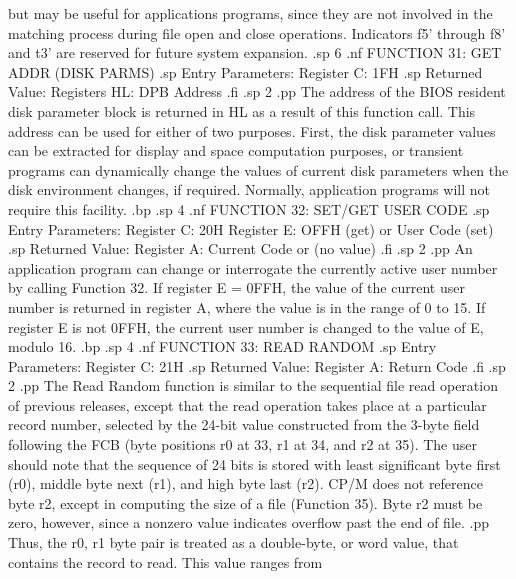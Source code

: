 but may be useful for applications programs, since they are not 
involved in the matching process during file open and close 
operations.  Indicators f5' through f8' and t3' are reserved for 
future system expansion.
.sp 6
.nf
               FUNCTION 31:  GET ADDR (DISK PARMS)
.sp
                Entry Parameters:
                      Register C:  1FH
.sp
                Returned Value:
                    Registers HL:  DPB Address
.fi
.sp 2
.pp
The address of the BIOS resident disk parameter block is returned 
in HL as a result of this function call.  This address can be 
used for either of two purposes.  First, the disk parameter 
values can be extracted for display and space computation 
purposes, or transient programs can dynamically change the values 
of current disk parameters when the disk environment changes, if 
required.  Normally, application programs will not require this 
facility.
.bp
.sp 4
.nf
                 FUNCTION 32:  SET/GET USER CODE
.sp
               Entry Parameters:
                     Register C:  20H
                     Register E:  OFFH (get) or
                                  User Code (set)
.sp
               Returned Value:
                    Register  A:  Current Code or
                                  (no value)
.fi
.sp 2
.pp
An application program can change or interrogate the currently 
active user number by calling Function 32.  If register E = 0FFH, 
the value of the current user number is returned in register A, 
where the value is in the range of 0 to 15.  If register E is not 
0FFH, the current user number is changed to the value of E, 
modulo 16.
.bp
.sp 4
.nf
                    FUNCTION 33:  READ RANDOM
.sp
                 Entry Parameters:
                       Register C:  21H
.sp
                 Returned Value:
                      Register  A:  Return Code
.fi
.sp 2
.pp
The Read Random function is similar to the sequential file read 
operation of previous releases, except that the read operation 
takes place at a particular record number, selected by the 24-bit 
value constructed from the 3-byte field following the FCB (byte 
positions r0 at 33, r1 at 34, and r2 at 35).  The user should 
note that the sequence of 24 bits is stored with least 
significant byte first (r0), middle byte next (r1), and high byte 
last (r2).  CP/M does not reference byte r2, except in computing 
the size of a file (Function 35).  Byte r2 must be zero, however, 
since a nonzero value indicates overflow past the end of file.
.pp
Thus, the r0, r1 byte pair is treated as a double-byte, or word 
value, that contains the record to read.  This value ranges from 
